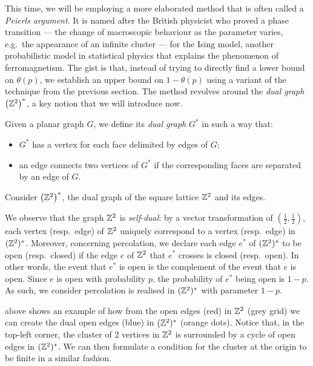 \documentclass[a4paper, 12pt]{article}
\begin{document}
This time, we will be employing a more elaborated method that is often called a \textit{Peierls argument}. It is named after the British physicist who proved a phase transition --- the change of macroscopic behaviour as the parameter varies, e.g.\ the appearance of an infinite cluster --- for the Ising model, another probabilistic model in statistical physics that explains the phenomenon of ferromagnetism. The gist is that, instead of trying to directly find a lower bound on $\theta(p)$, we establish an upper bound on $1 - \theta(p)$ using a variant of the technique from the previous section. The method revolves around the \textit{dual graph} $\left(\mathbb{Z}^2\right)^*$, a key notion that we will introduce now.

\begin{defn}\label{defn:dual_graph}
Given a planar graph $G$, we define its \textit{dual graph} $G^*$ in such a way that:
\begin{itemize}
    \item $G^*$ has a vertex for each face delimited by edges of $G$;
    \item an edge connects two vertices of $G^*$ if the corresponding faces are separated by an edge of $G$.
\end{itemize}
\end{defn}
\begin{ex}\label{ex:dual_lattice}
Consider $\left(\mathbb{Z}^2\right)^*$, the dual graph of the square lattice $\mathbb{Z}^2$ and its edges.


We observe that the graph $\mathbb{Z}^2$ is \textit{self-dual}: by a vector transformation of $(\frac{1}{2}, \frac{1}{2})$, each vertex (resp.\ edge) of $\mathbb{Z}^2$ uniquely correspond to a vertex (resp.\ edge) in $(\mathbb{Z}^2)^*$. Moreover, concerning percolation, we declare each edge $e^*$ of $(\mathbb{Z}^2)^*$ to be open (resp.\ closed) if the edge $e$ of $\mathbb{Z}^2$ that $e^*$ crosses is closed (resp.\ open). In other words, the event that $e^*$ is open is the complement of the event that $e$ is open. Since $e$ is open with probability $p$, the probability of $e^*$ being open is $1 - p$. As such, we consider percolation is realised in $(\mathbb{Z}^2)^*$ with parameter $1 - p$.

 above shows an example of how from the open edges (red) in $\mathbb{Z}^2$ (grey grid) we can create the dual open edges (blue) in $(\mathbb{Z}^2)^*$ (orange dots). Notice that, in the top-left corner, the cluster of 2 vertices in $\mathbb{Z}^2$ is surrounded by a cycle of open edges in $(\mathbb{Z}^2)^*$. We can then formulate a condition for the cluster at the origin to be finite in a similar fashion.
\end{ex}
\end{document}
